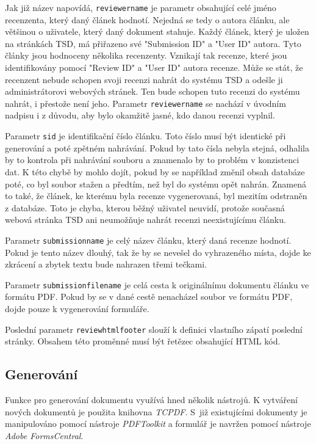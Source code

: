 \documentclass[czech,BP]{thesiskiv}
\begin{document}
Jak již název napovídá, \texttt{reviewer\textunderscore name} je parametr obsahující celé jméno recenzenta, který daný článek hodnotí. Nejedná se tedy o autora článku, ale většinou o uživatele, který daný dokument stahuje. Každý článek, který je uložen na stránkách TSD, má přiřazeno své "Submission ID" a "User ID" autora. Tyto články jsou hodnoceny několika recenzenty. Vznikají tak recenze, které jsou identifikovány pomocí "Review ID" a "User ID" autora recenze. Může se stát, že recenzent nebude schopen svoji recenzi nahrát do systému TSD a odešle ji administrátorovi webových stránek. Ten bude schopen tuto recenzi do systému nahrát, i přestože není jeho. Parametr \texttt{reviewer\textunderscore name} se nachází v úvodním nadpisu i z důvodu, aby bylo okamžitě jasné, kdo danou recenzi vyplnil.

Parametr \texttt{sid} je identifikační číslo článku. Toto číslo musí být identické při generování a poté zpětném nahrávání. Pokud by tato čísla nebyla stejná, odhalila by to kontrola při nahrávání souboru a znamenalo by to problém v konzistenci dat. K této chybě by mohlo dojít, pokud by se například změnil obsah databáze poté, co byl soubor stažen a předtím, než byl do systému opět nahrán. Znamená to také, že článek, ke kterému byla recenze vygenerovaná, byl mezitím odstraněn z databáze. Toto je chyba, kterou běžný uživatel neuvidí, protože současná webová stránka TSD ani neumožňuje nahrát recenzi neexistujícímu článku.  

Parametr \texttt{submission\textunderscore name} je celý název článku, který daná recenze hodnotí. Pokud je tento název dlouhý, tak že by se nevešel do vyhrazeného místa, dojde ke zkrácení a zbytek textu bude nahrazen třemi tečkami. 

Parametr \texttt{submission\textunderscore filename} je celá cesta k originálnímu dokumentu článku ve formátu PDF. Pokud by se v dané cestě nenacházel soubor ve formátu PDF, dojde pouze k vygenerování formuláře.

Poslední parametr \texttt{review\textunderscore html\textunderscore footer} slouží k definici vlastního zápatí poslední stránky. Obsahem této proměnné musí být řetězec obsahující HTML kód. 
\subsection{Generování}
Funkce pro generování dokumentu využívá hned několik nástrojů. K vytváření nových dokumentů je použita knihovna \emph{TCPDF}. S~již existujícími dokumenty je manipulováno pomocí nástroje \emph{PDFToolkit} a formulář je navržen pomocí nástroje \emph{Adobe FormsCentral}. 
\end{document}
